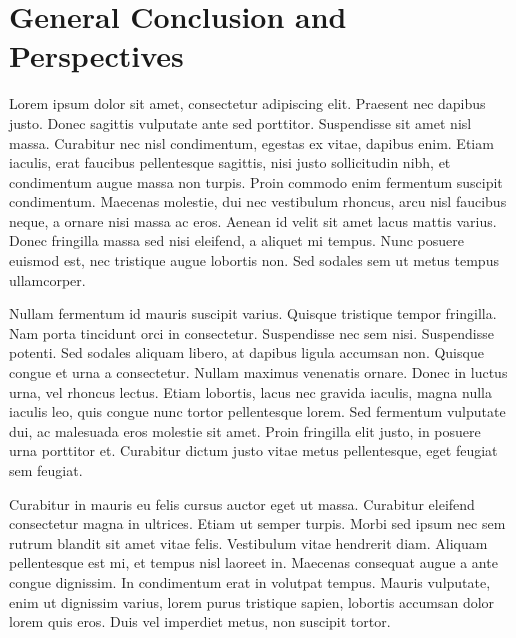 \chapter*{General Conclusion and Perspectives}




\label{chap:General Conclusion} 

Lorem ipsum dolor sit amet, consectetur adipiscing elit. Praesent nec dapibus justo. Donec sagittis vulputate ante sed porttitor. Suspendisse sit amet nisl massa. Curabitur nec nisl condimentum, egestas ex vitae, dapibus enim. Etiam iaculis, erat faucibus pellentesque sagittis, nisi justo sollicitudin nibh, et condimentum augue massa non turpis. Proin commodo enim fermentum suscipit condimentum. Maecenas molestie, dui nec vestibulum rhoncus, arcu nisl faucibus neque, a ornare nisi massa ac eros. Aenean id velit sit amet lacus mattis varius. Donec fringilla massa sed nisi eleifend, a aliquet mi tempus. Nunc posuere euismod est, nec tristique augue lobortis non. Sed sodales sem ut metus tempus ullamcorper.

Nullam fermentum id mauris suscipit varius. Quisque tristique tempor fringilla. Nam porta tincidunt orci in consectetur. Suspendisse nec sem nisi. Suspendisse potenti. Sed sodales aliquam libero, at dapibus ligula accumsan non. Quisque congue et urna a consectetur. Nullam maximus venenatis ornare. Donec in luctus urna, vel rhoncus lectus. Etiam lobortis, lacus nec gravida iaculis, magna nulla iaculis leo, quis congue nunc tortor pellentesque lorem. Sed fermentum vulputate dui, ac malesuada eros molestie sit amet. Proin fringilla elit justo, in posuere urna porttitor et. Curabitur dictum justo vitae metus pellentesque, eget feugiat sem feugiat.

Curabitur in mauris eu felis cursus auctor eget ut massa. Curabitur eleifend consectetur magna in ultrices. Etiam ut semper turpis. Morbi sed ipsum nec sem rutrum blandit sit amet vitae felis. Vestibulum vitae hendrerit diam. Aliquam pellentesque est mi, et tempus nisl laoreet in. Maecenas consequat augue a ante congue dignissim. In condimentum erat in volutpat tempus. Mauris vulputate, enim ut dignissim varius, lorem purus tristique sapien, lobortis accumsan dolor lorem quis eros. Duis vel imperdiet metus, non suscipit tortor.


